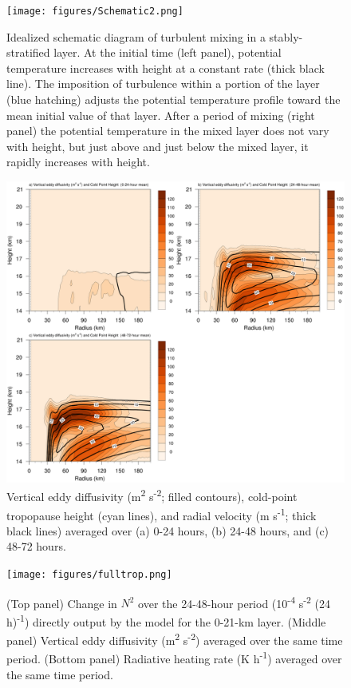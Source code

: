 \documentclass{ametsoc}
\begin{document}
\begin{figure}[ht]
\centerline{\texttt{[image: figures/Schematic2.png]}}
\caption{Idealized schematic diagram of turbulent mixing in a stably-stratified layer. At the initial time (left panel), potential temperature increases with height at a constant rate (thick black line). The imposition of turbulence within a portion of the layer (blue hatching) adjusts the potential temperature profile toward the mean initial value of that layer. After a period of mixing (right panel) the potential temperature in the mixed layer does not vary with height, but just above and just below the mixed layer, it rapidly increases with height.}
\label{fig:schematic}
\end{figure}

\begin{figure}[ht]
\centerline{\includegraphics[width=39pc]{figures/khvten.png}}
\caption{Vertical eddy diffusivity (m\textsuperscript{2} s\textsuperscript{-2}; filled contours), cold-point tropopause height (cyan lines), and radial velocity (m s\textsuperscript{-1}; thick black lines) averaged over (a) 0-24 hours, (b) 24-48 hours, and (c) 48-72 hours.}
\label{fig:diff}
\end{figure}

\begin{figure}[ht]
\centerline{\texttt{[image: figures/fulltrop.png]}}
\end{figure}
\begin{figure}
\caption{(Top panel) Change in $N^2$ over the 24-48-hour period (10\textsuperscript{-4} s\textsuperscript{-2} (24 h)\textsuperscript{-1}) directly output by the model for the 0-21-km layer. (Middle panel) Vertical eddy diffusivity (m\textsuperscript{2} s\textsuperscript{-2}) averaged over the same time period. (Bottom panel) Radiative heating rate (K h\textsuperscript{-1}) averaged over the same time period.}
\label{fig:fulltrop}
\end{figure}
\end{document}
